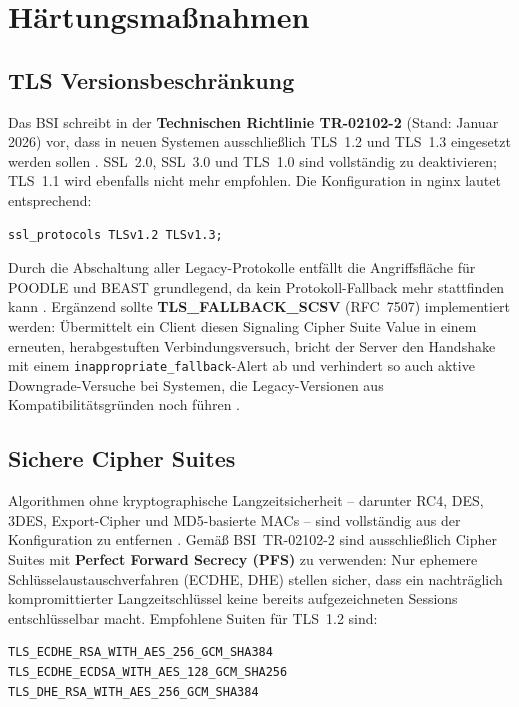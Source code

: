 \section{Härtungsmaßnahmen}
\subsection*{TLS Versionsbeschränkung}

Das BSI schreibt in der \textbf{Technischen Richtlinie TR-02102-2} (Stand: Januar 2026) vor, dass in neuen Systemen ausschließlich TLS~1.2 und TLS~1.3 eingesetzt werden sollen \cite{bsi-tr02102}. SSL~2.0, SSL~3.0 und TLS~1.0 sind vollständig zu deaktivieren; TLS~1.1 wird ebenfalls nicht mehr empfohlen. Die Konfiguration in nginx lautet entsprechend:

\begin{lstlisting}
ssl_protocols TLSv1.2 TLSv1.3;
\end{lstlisting}

Durch die Abschaltung aller Legacy-Protokolle entfällt die Angriffsfläche für POODLE und BEAST \cite{cve-beast} grundlegend, da kein Protokoll-Fallback mehr stattfinden kann \cite{thomas-krenn-poodle}. Ergänzend sollte \textbf{TLS\_FALLBACK\_SCSV} (RFC~7507) implementiert werden: Übermittelt ein Client diesen Signaling Cipher Suite Value in einem erneuten, herabgestuften Verbindungsversuch, bricht der Server den Handshake mit einem \texttt{inappropriate\_fallback}-Alert ab und verhindert so auch aktive Downgrade-Versuche bei Systemen, die Legacy-Versionen aus Kompatibilitätsgründen noch führen \cite{rfc7507}.

\subsection*{Sichere Cipher Suites}

Algorithmen ohne kryptographische Langzeitsicherheit -- darunter RC4, DES, 3DES, Export-Cipher und MD5-basierte MACs -- sind vollständig aus der Konfiguration zu entfernen \cite{bsi-tr02102}. Gemäß BSI~TR-02102-2 sind ausschließlich Cipher Suites mit \textbf{Perfect Forward Secrecy (PFS)} zu verwenden: Nur ephemere Schlüsselaustauschverfahren (ECDHE, DHE) stellen sicher, dass ein nachträglich kompromittierter Langzeitschlüssel keine bereits aufgezeichneten Sessions entschlüsselbar macht. Empfohlene Suiten für TLS~1.2 sind:

\begin{lstlisting}
TLS_ECDHE_RSA_WITH_AES_256_GCM_SHA384
TLS_ECDHE_ECDSA_WITH_AES_128_GCM_SHA256
TLS_DHE_RSA_WITH_AES_256_GCM_SHA384
\end{lstlisting}

